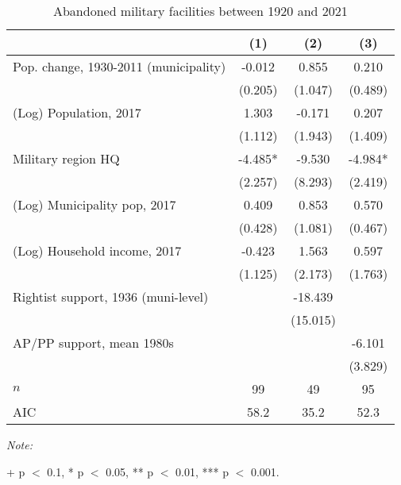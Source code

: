 \begin{table}[!h]

\caption{Abandoned military facilities between 1920 and 2021\label{tab:glm\_lost\_c1920}}
\centering
\begin{threeparttable}
\begin{tabular}[t]{lccc}
\toprule
  & (1) & (2) & (3)\\
\midrule
Pop. change, 1930-2011 (municipality) & -0.012 & 0.855 & 0.210\\
 & (0.205) & (1.047) & (0.489)\\
(Log) Population, 2017 & 1.303 & -0.171 & 0.207\\
 & (1.112) & (1.943) & (1.409)\\
Military region HQ & -4.485* & -9.530 & -4.984*\\
 & (2.257) & (8.293) & (2.419)\\
(Log) Municipality pop, 2017 & 0.409 & 0.853 & 0.570\\
 & (0.428) & (1.081) & (0.467)\\
(Log) Household income, 2017 & -0.423 & 1.563 & 0.597\\
 & (1.125) & (2.173) & (1.763)\\
Rightist support, 1936 (muni-level) &  & -18.439 & \\
 &  & (15.015) & \\
AP/PP support, mean 1980s &  &  & -6.101\\
 &  &  & (3.829)\\
\midrule
$n$ & 99 & 49 & 95\\
AIC & 58.2 & 35.2 & 52.3\\
\bottomrule
\end{tabular}
\begin{tablenotes}[para]
\item \textit{Note: } 
\item + p $<$ 0.1, * p $<$ 0.05, ** p $<$ 0.01, *** p $<$ 0.001.
\end{tablenotes}
\end{threeparttable}
\end{table}
